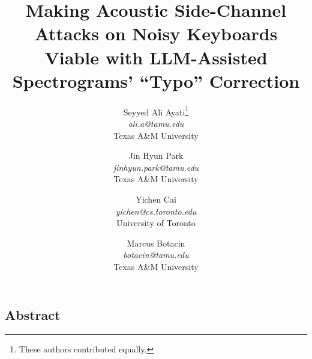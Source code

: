 \documentclass[letterpaper,twocolumn,10pt]{article}
\begin{document}
\pagestyle{empty}

\date{}

\title{\Large \bf Making Acoustic Side-Channel Attacks on Noisy Keyboards Viable with LLM-Assisted Spectrograms' ``Typo'' Correction
}

\author{
  Seyyed Ali Ayati\thanks{These authors contributed equally.} \\ 
  \textit{ali.a@tamu.edu} \\
  Texas A\&M University
  \and
  Jin Hyun Park\footnotemark[1] \\
  \textit{jinhyun.park@tamu.edu} \\
  Texas A\&M University
  \and
  Yichen Cai \\
  \textit{yichen@cs.toronto.edu} \\
  University of Toronto
  \and
  Marcus Botacin \\
  \textit{botacin@tamu.edu} \\
  Texas A\&M University
}

\maketitle


\subsection*{Abstract}










\footnotesize 

\end{document}

